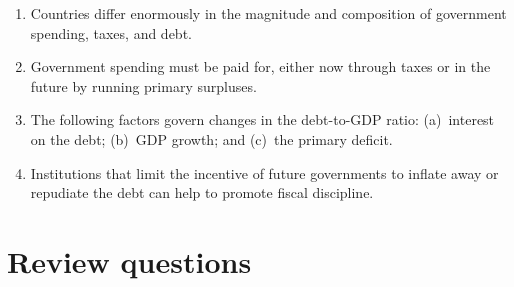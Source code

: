 \begin{enumerate}

\item Countries differ enormously in the magnitude and composition
of government spending, taxes, and debt.

\item Government spending must be paid for, either now through
taxes or in the future by running primary surpluses.

\item The following factors govern changes in the debt-to-GDP ratio:
(a)~interest on the debt;
(b)~GDP growth;
and (c)~the primary deficit.

\item Institutions that limit the incentive of future governments to inflate
away or repudiate the debt can help to promote fiscal discipline.

\end{enumerate}

\section*{Review questions}

